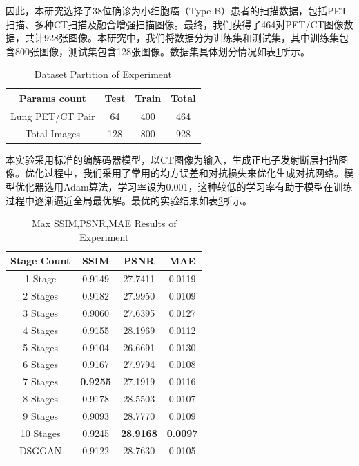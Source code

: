\documentclass[twocolumn]{article}
\begin{document}
因此，本研究选择了38位确诊为小细胞癌（Type B）患者的扫描数据，包括PET扫描、多种CT扫描及融合增强扫描图像。最终，我们获得了464对PET/CT图像数据，共计928张图像。本研究中，我们将数据分为训练集和测试集，其中训练集包含800张图像，测试集包含128张图像。数据集具体划分情况如表\ref{tab:dataset_partition_1}所示。

\begin{table}[h]
	\centering
	\caption{Dataset Partition of Experiment}
	\label{tab:dataset_partition_1}
	\begin{tabular}{cccc}
		\toprule
		Params count     & Test & Train & Total \\
		\midrule
		Lung PET/CT Pair & 64   & 400   & 464   \\
		Total Images     & 128  & 800   & 928   \\
		\bottomrule
	\end{tabular}
\end{table}

本实验采用标准的编解码器模型，以CT图像为输入，生成正电子发射断层扫描图像。优化过程中，我们采用了常用的均方误差和对抗损失来优化生成对抗网络。模型优化器选用Adam算法，学习率设为0.001，这种较低的学习率有助于模型在训练过程中逐渐逼近全局最优解。最优的实验结果如表\ref{tab:exps_result}所示。

\begin{table}[h]
	\centering
	\caption{Max SSIM,PSNR,MAE Results of Experiment}
	\label{tab:exps_result}
	\begin{tabular}{cccc}
		\toprule
		Stage Count & SSIM            & PSNR             & MAE             \\
		\midrule
		1 Stage     & 0.9149          & 27.7411          & 0.0119          \\
		2 Stages    & 0.9182          & 27.9950          & 0.0109          \\
		3 Stages    & 0.9060          & 27.6395          & 0.0127          \\
		4 Stages    & 0.9155          & 28.1969          & 0.0112          \\
		5 Stages    & 0.9104          & 26.6691          & 0.0130          \\
		6 Stages    & 0.9167          & 27.9794          & 0.0108          \\
		7 Stages    & \textbf{0.9255} & 27.1919          & 0.0116          \\
		8 Stages    & 0.9178          & 28.5503          & 0.0107          \\
		9 Stages    & 0.9093          & 28.7770          & 0.0109          \\
		10 Stages   & 0.9245          & \textbf{28.9168} & \textbf{0.0097} \\
		DSGGAN    & 0.9122          & 28.7630          & 0.0105          \\
		\bottomrule
	\end{tabular}
\end{table}
\end{document}
